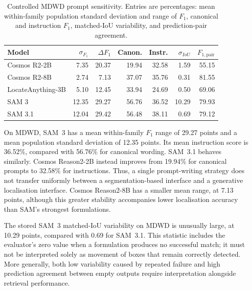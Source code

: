 \begin{table}[htbp]
\centering
\small
\caption{Controlled MDWD prompt sensitivity. Entries are percentages: mean within-family population standard deviation and range of $F_1$, canonical and instruction $F_1$, matched-\gls{IoU} variability, and prediction-pair agreement.}
\label{tab:ev-mdwd-sensitivity}
\renewcommand{\arraystretch}{1.15}
\begin{tabularx}{\textwidth}{@{}>{\raggedright\arraybackslash}Xrrrrrr@{}}
\toprule
Model & $\sigma_{F_1}$ & $\Delta F_1$ & Canon. & Instr. & $\sigma_{IoU}$ & $F_{1,\mathrm{pair}}$ \\
\midrule
Cosmos R2-2B & 7.35 & 20.37 & 19.94 & 32.58 & 1.59 & 55.15 \\
Cosmos R2-8B & 2.74 & 7.13 & 37.07 & 35.76 & 0.31 & 81.55 \\
LocateAnything-3B & 5.10 & 12.45 & 33.94 & 24.69 & 0.50 & 69.06 \\
SAM 3 & 12.35 & 29.27 & 56.76 & 36.52 & 10.29 & 79.93 \\
SAM 3.1 & 12.04 & 29.42 & 56.48 & 38.11 & 0.69 & 79.12 \\
\bottomrule
\end{tabularx}
\end{table}


On \gls{MDWD}, SAM~3 has a mean within-family \(F_1\) range of 29.27 points and a mean population standard deviation of 12.35 points. Its mean instruction score is 36.52\%, compared with 56.76\% for canonical wording. SAM~3.1 behaves similarly. Cosmos Reason2-2B instead improves from 19.94\% for canonical prompts to 32.58\% for instructions. Thus, a single prompt-writing strategy does not transfer uniformly between a segmentation-based interface and a generative localisation interface. Cosmos Reason2-8B has a smaller mean range, at 7.13 points, although this greater stability accompanies lower localisation accuracy than SAM's strongest formulations.

The stored SAM~3 matched-\gls{IoU} variability on MDWD is unusually large, at 10.29 points, compared with 0.69 for SAM~3.1. This statistic includes the evaluator's zero value when a formulation produces no successful match; it must not be interpreted solely as movement of boxes that remain correctly detected. More generally, both low variability caused by repeated failure and high prediction agreement between empty outputs require interpretation alongside retrieval performance.

